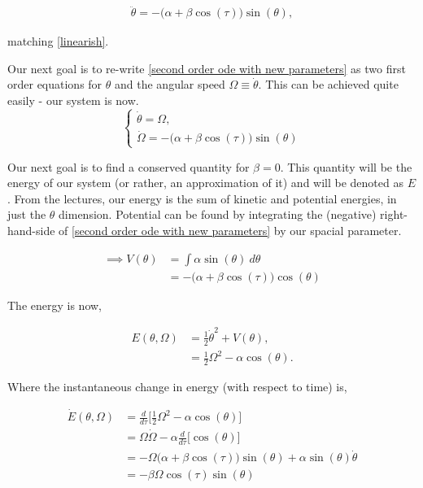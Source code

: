 \documentclass[12pt]{article}
\begin{document}
\begin{enumerate}
\begin{solution}
        \begin{align}
            \ddot{\theta} = -\big(\alpha + \beta \cos(\tau)\big)\sin(\theta),   \label{second order ode with new parameters}
        \end{align}

        matching \ref{linearish}. 

        Our next goal is to re-write \ref{second order ode with new parameters} as two first order equations for $\theta$ and the angular speed $\Omega \equiv \dot{\theta}$. This can be achieved quite easily - our system is now. 
        \begin{equation}
        \begin{cases}
            \dot{\theta} = \Omega, \\
            \dot{\Omega} = -\big(\alpha + \beta \cos(\tau)\big)\sin(\theta)
        \end{cases}    
        \end{equation}

        Our next goal is to find a conserved quantity for $\beta = 0$. This quantity will be the energy of our system (or rather, an approximation of it) and will be denoted as $E$. From the lectures, our energy is the sum of kinetic and potential energies, in just the $\theta$ dimension. Potential can be found by integrating the (negative) right-hand-side of \ref{second order ode with new parameters} by our spacial parameter. 

        \begin{align}
            \implies V(\theta) &= \int \alpha\sin(\theta) \ d\theta \nonumber\\
            &= -\big(\alpha + \beta\cos(\tau))\cos(\theta)
        \end{align}

        The energy is now,

        \begin{align}
            E(\theta, \Omega) &= \frac{1}{2} \dot{\theta}^2 + V(\theta),    \nonumber   \\
            &= \frac{1}{2} \Omega^2 -\alpha\cos(\theta).
        \end{align}

        Where the instantaneous change in energy (with respect to time) is,

        \begin{align}
            \dot{E}(\theta, \Omega) &=  \frac{d}{d\tau}\bigg[ \frac{1}{2}\Omega^2 - \alpha\cos(\theta) \bigg]  \nonumber\\
            &= \Omega\dot{\Omega} - \alpha\frac{d}{d\tau}\bigg[ \cos(\theta) \bigg] \nonumber\\
            &= -\Omega\big(\alpha + \beta \cos(\tau)\big)\sin(\theta) + \alpha\sin(\theta)\dot{\theta}\nonumber\\
            &= -\beta\Omega\cos(\tau)\sin(\theta)
        \end{align}
        \end{solution}
\end{enumerate}
\end{document}
